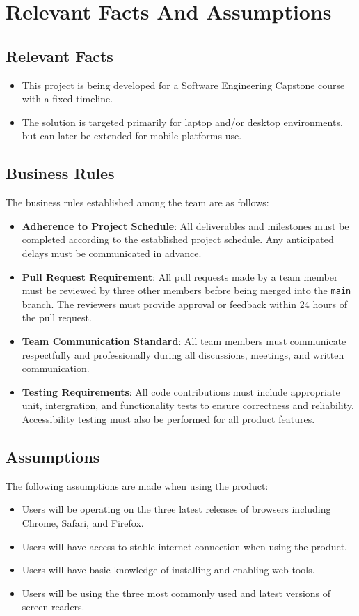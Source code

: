 \documentclass[12pt]{article}
\begin{document}
\section{Relevant Facts And Assumptions}
\subsection{Relevant Facts}
\begin{itemize}
  \item This project is being developed for a Software Engineering
    Capstone course with a fixed timeline.
  \item The solution is targeted primarily for laptop and/or desktop
    environments, but can later be extended for mobile platforms use.
\end{itemize}
\subsection{Business Rules}
The business rules established among the team are as follows:
\begin{itemize}
  \item \textbf{Adherence to Project Schedule}: All deliverables and
    milestones must be
    completed according to the established project schedule. Any
    anticipated delays must be communicated
    in advance.
  \item \textbf{Pull Request Requirement}: All pull requests made by
    a team member must be reviewed by
    three other members before being merged into the \texttt{main}
    branch. The reviewers must provide approval
    or feedback within 24 hours of the pull request.
  \item \textbf{Team Communication Standard}: All team members must
    communicate respectfully and professionally during
    all discussions, meetings, and written communication.
  \item \textbf{Testing Requirements}: All code contributions must
    include appropriate unit, intergration, and
    functionality tests to ensure correctness and reliability.
    Accessibility testing must also be performed for all
    product features.
\end{itemize}
\subsection{Assumptions}
The following assumptions are made when using the product:
\begin{itemize}
  \item Users will be operating on the three latest releases of
    browsers including Chrome, Safari, and Firefox.
  \item Users will have access to stable internet connection when
    using the product.
  \item Users will have basic knowledge of installing and enabling web tools.
  \item Users will be using the three most commonly used and latest
    versions of screen readers.
\end{itemize}
\end{document}
